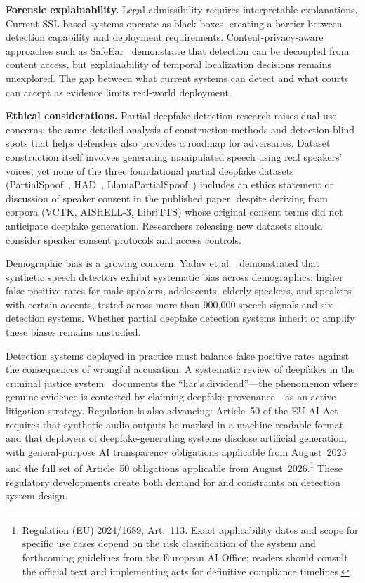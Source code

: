 \documentclass[journal]{IEEEtran}
\begin{document}
\textbf{Forensic explainability.} Legal admissibility requires interpretable explanations. Current SSL-based systems operate as black boxes, creating a barrier between detection capability and deployment requirements. Content-privacy-aware approaches such as SafeEar~\cite{li2024safeear} demonstrate that detection can be decoupled from content access, but explainability of temporal localization decisions remains unexplored. The gap between what current systems can detect and what courts can accept as evidence limits real-world deployment.

\textbf{Ethical considerations.} Partial deepfake detection research raises dual-use concerns: the same detailed analysis of construction methods and detection blind spots that helps defenders also provides a roadmap for adversaries. Dataset construction itself involves generating manipulated speech using real speakers' voices, yet none of the three foundational partial deepfake datasets (PartialSpoof~\cite{zhang2023partialspoof}, HAD~\cite{yi2021had}, LlamaPartialSpoof~\cite{luong2025llamapartialspoof}) includes an ethics statement or discussion of speaker consent in the published paper, despite deriving from corpora (VCTK, AISHELL-3, LibriTTS) whose original consent terms did not anticipate deepfake generation. Researchers releasing new datasets should consider speaker consent protocols and access controls.

Demographic bias is a growing concern. Yadav et al.~\cite{yadav2024fairssd} demonstrated that synthetic speech detectors exhibit systematic bias across demographics: higher false-positive rates for male speakers, adolescents, elderly speakers, and speakers with certain accents, tested across more than 900,000 speech signals and six detection systems. Whether partial deepfake detection systems inherit or amplify these biases remains unstudied.

Detection systems deployed in practice must balance false positive rates against the consequences of wrongful accusation. A systematic review of deepfakes in the criminal justice system~\cite{sandoval2024deepfakes} documents the ``liar's dividend''---the phenomenon where genuine evidence is contested by claiming deepfake provenance---as an active litigation strategy. Regulation is also advancing: Article~50 of the EU AI Act~\cite{euaiact2024} requires that synthetic audio outputs be marked in a machine-readable format and that deployers of deepfake-generating systems disclose artificial generation, with general-purpose AI transparency obligations applicable from August~2025 and the full set of Article~50 obligations applicable from August~2026.\footnote{Regulation (EU) 2024/1689, Art.~113. Exact applicability dates and scope for specific use cases depend on the risk classification of the system and forthcoming guidelines from the European AI Office; readers should consult the official text and implementing acts for definitive compliance timelines.} These regulatory developments create both demand for and constraints on detection system design.
\end{document}
